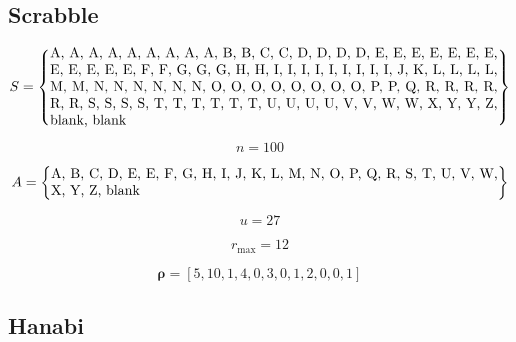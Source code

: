 \documentclass{article}
\begin{document}
\subsection{Scrabble}

\begin{equation}\nonumber
    S = \left \{
    \parbox{32em}{A, A, A, A, A, A, A, A, A, B, B, C, C, D, D, D, D, E, E, E, E, E, E, E, E, E, E, E, E, F, F, G, G, G, H, H, I, I, I, I, I, I, I, I, I, J, K, L, L, L, L, M, M, N, N, N, N, N, N, O, O, O, O, O, O, O, O, P, P, Q, R, R, R, R, R, R, S, S, S, S, T, T, T, T, T, T, U, U, U, U, V, V, W, W, X, Y, Y, Z, blank, blank}\right \}
\end{equation}

\begin{equation}\nonumber
    n = 100
\end{equation}

\begin{equation}\nonumber
    A = \left \{
    \parbox{32em}{A, B, C, D, E, E, F, G, H, I, J, K, L, M, N, O, P, Q, R, S, T, U, V, W, X, Y, Z, blank}\right \}
\end{equation}

\begin{equation}\nonumber
    u = 27
\end{equation}

\begin{equation}\nonumber
    r_{\max} = 12
\end{equation}

\begin{equation}\nonumber
    \bm{\rho} = [5, 10, 1, 4, 0, 3, 0, 1, 2, 0, 0, 1]
\end{equation}

\subsection{Hanabi}
\end{document}
